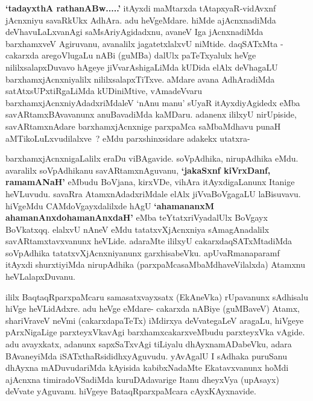 \begin{artha}
\textbf{`tadayxthA rathanABw.....'} itAyxdi maMtarxda tAtapxyaR-vidAvxnf jAcnxniyu  savaRkUkx AdhAra. adu heVgeMdare. hiMde ajAcnxnadiMda deVhavuLaLxvanAgi saMsAriyAgidadxnu, avaneV Iga jAcnxnadiMda barxhamxveV Agiruvanu, avanalilx jagatetxlalxvU niMtide. daqSATxMta - cakarxda aregoVlugaLu nABi (guMBa) dalUlx paTeTxyalulx heVge nililxsalapxDuvavo hAgeye jiVvarAshigaLiMda kUDida elAlx deVhagaLU \-barxhamxjAcnxniyalilx nililxsalapxTiTxve. aMdare avana AdhAradiMda satAtxsUPxtiRgaLiMda kUDiniMtive, vAmadeVvaru barxhamxjAcnxniyAdadxriMdaleV `nAnu manu' sUyaR itAyxdiyAgidedx eMba savARtamxBAvavanunx anuBavadiMda kaMDaru. adanenx ililxyU nirUpiside, savARtamxnAdare barxhamxjAcnxnige parxpaMca saMbaMdhavu punaH aMTikoLuLxvudilalxve~? eMdu parxshinxsidare adakekx utatxra- 

barxhamxjAcnxnigaLalilx eraDu viBAgavide. soVpAdhika, nirupAdhika eMdu. avaralilx soVpAdhikanu savARtamxnAguvanu, \textbf{`jakaSxnf kiVrxDanf, ramamANaH'} eMbudu BoVjana, kirxVDe, vihAra itAyxdigaLanunx Itanige heVLuvudu. savaRra AtamxnAdadxriMdale elAlx jiVvaBoVgagaLU laBisuvavu. hiVgeMdu CAMdoVgayxdalilxde hAgU \textbf{`ahamananxM ahamanAnxdo\s hamanAnxdaH'} eMba teYtatxriVyadalUlx BoVgayx BoVkatxqq. elalxvU nAneV eMdu tatatxvXjAcnxniya sAmagAnadalilx savARtamxtavxvanunx heVLide. adaraMte ililxyU cakarxdaqSATxMtadiMda soVpAdhika tatatxvXjAcnxniyanunx garxhisabeVku. apUvaRmanaparamf itAyxdi shurxtiyiMda nirupAdhika (parxpaMcasaMbaMdhaveVilalxda) Atamxnu heVLalapxDuvanu.
\end{artha}

\centerline{}

\begin{artha}
ililx BaqtaqRparxpaMcaru samasatxvayxsatx (EkAneVka) rUpavanunx sAdhisalu hiVge heVLidAdxre. adu heVge eMdare- cakarxda nABiye (guMBaveV) Atamx, shariVraveV neVmi (cakarxdapaTeTx) iMdirxya deVvategaLeV aragaLu, hiVgeye pArxNigaLige parxteyxVkavAgi barxhamxcakarxveMbudu parxteyxVka vAgide. adu avayxkatx, adanunx sapxSaTxvAgi tiLiyalu dhAyxnamADabeVku, adara BAvaneyiMda iSATxthaRsididhxyAguvudu. yAvAgalU I sAdhaka puruSanu dhAyxna mADuvudariMda kAyisida kabibxNadaMte Ekatavxvanunx hoMdi ajAcnxna timiradoVSadiMda kuruDAdavarige Itanu dheyxVya (upAsayx) deVvate  yAguvanu. hiVgeye BataqRparxpaMcara cAyxKAyxnavide.
\end{artha}

\centerline{}

